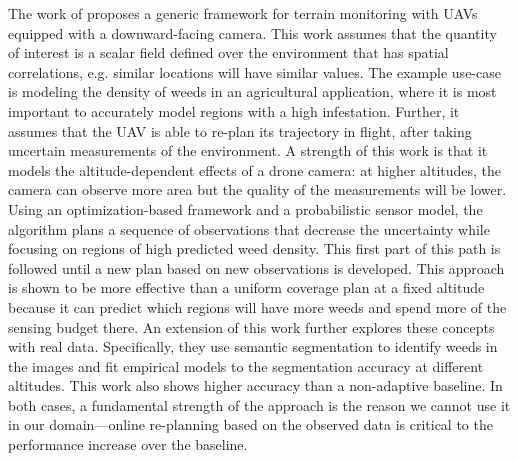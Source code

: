 The work of \cite{Popovic2020} proposes a generic framework for terrain monitoring with UAVs equipped with a downward-facing camera. This work assumes that the quantity of interest is a scalar field defined over the environment that has spatial correlations, e.g. similar locations will have similar values. The example use-case is modeling the density of weeds in an agricultural application, where it is most important to accurately model regions with a high infestation. Further, it assumes that the UAV is able to re-plan its trajectory in flight, after taking uncertain measurements of the environment. A strength of this work is that it models the altitude-dependent effects of a drone camera: at higher altitudes, the camera can observe more area but the quality of the measurements will be lower. Using an optimization-based framework and a probabilistic sensor model, the algorithm plans a sequence of observations that decrease the uncertainty while focusing on regions of high predicted weed density. This first part of this path is followed until a new plan based on new observations is developed. This approach is shown to be more effective than a uniform coverage plan at a fixed altitude because it can predict which regions will have more weeds and spend more of the sensing budget there. An extension of this work \cite{Stache2021AdaptiveSegmentation} further explores these concepts with real data. Specifically, they use semantic segmentation to identify weeds in the images and fit empirical models to the segmentation accuracy at different altitudes. This work also shows higher accuracy than a non-adaptive baseline. In both cases, a fundamental strength of the approach is the reason we cannot use it in our domain---online re-planning based on the observed data is critical to the performance increase over the baseline.

